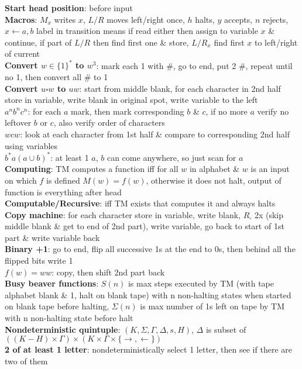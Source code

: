 \documentclass[a4paper]{article}
\begin{document}
\begin{multicols}{2}
        \textbf{Start head position}: before input\\
        \textbf{Macros}: $M_x$ writes $x$, $L/R$ moves left/right once, $h$ halts, $y$ accepts, $n$ rejects, $x \leftarrow a,b$ label in transition means if read either then assign to variable $x$ \& continue, if part of $L/R$ then find first one \& store, $L/R_x$ find first $x$ to left/right of current\\
        \boldmath\textbf{Convert $w \in {\{1\}}^*$ to $w^3$}\unboldmath: mark each 1 with \#, go to end, put 2 \#, repeat until no 1, then convert all \# to 1\\
        \boldmath\textbf{Convert $u \square w$ to $uw$\unboldmath}: start from middle blank, for each character in 2nd half store in variable, write blank in original spot, write variable to the left\\
        \boldmath$a^n b^n c^n$\unboldmath: for each $a$ mark, then mark corresponding $b$ \& $c$, if no more $a$ verify no leftover $b$ or $c$, also verify order of characters\\
        \boldmath$wcw$\unboldmath: look at each character from 1st half \& compare to corresponding 2nd half using variables\\
        \boldmath$b^* a{(a \cup b)}^*$\unboldmath: at least 1 $a$, $b$ can come anywhere, so just scan for $a$\\
        \textbf{Computing}: TM computes a function iff for all $w$ in alphabet \& $w$ is an input on which $f$ is defined $M(w) = f(w)$, otherwise it does not halt, output of function is everything after head\\
        \textbf{Computable/Recursive}: iff TM exists that computes it and always halts\\
        \textbf{Copy machine}: for each character store in variable, write blank, $R_\square$ 2x (skip middle blank \& get to end of 2nd part), write variable, go back to start of 1st part \& write variable back\\
        \textbf{Binary +1}: go to end, flip all successive 1s at the end to 0s, then behind all the flipped bits write 1\\
        \boldmath$f(w) = ww$\unboldmath: copy, then shift 2nd part back\\
        \textbf{Busy beaver functions}: $S(n)$ is max steps executed by TM (with tape alphabet blank \& 1, halt on blank tape) with n non-halting states when started on blank tape before halting, $\Sigma(n)$ is max number of 1s left on tape by TM with n non-halting state before halt\\
        \textbf{Nondeterministic quintuple}: $(K, \Sigma, \Gamma, \Delta, s, H)$, $\Delta$ is subset of $((K-H)\times\Gamma) \times (K\times\Gamma\times \{ \to, \leftarrow \})$\\
        \textbf{2 of at least 1 letter}: nondeterministically select 1 letter, then see if there are two of them\\
    \end{multicols}
    
\end{document}

